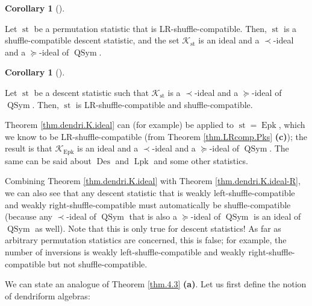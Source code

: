 \documentclass[numbers=enddot,12pt,final,onecolumn,notitlepage]{scrartcl}%
\theoremstyle{definition}
\newtheorem{coro}[theo]{Corollary}
\newenvironment{corollary}[1][]
{\begin{coro}[#1]\begin{leftbar}}
{\end{leftbar}\end{coro}}
\newenvironment{vershort}{}{}
\begin{document}
\begin{vershort}
\begin{corollary}
\label{cor.dendri.K.ideal-LR}Let $\operatorname*{st}$ be a permutation
statistic that is LR-shuffle-compatible. Then, $\operatorname*{st}$ is a
shuffle-compatible descent statistic, and the set $\mathcal{K}%
_{\operatorname*{st}}$ is an ideal and a $\left.  \prec\right.  $-ideal and a
$\left.  \succeq\right.  $-ideal of $\operatorname*{QSym}$.
\end{corollary}

\begin{corollary}
\label{cor.dendri.K.ideal-LRi}Let $\operatorname*{st}$ be a descent statistic
such that $\mathcal{K}_{\operatorname*{st}}$ is a $\left.  \prec\right.
$-ideal and a $\left.  \succeq\right.  $-ideal of $\operatorname*{QSym}$.
Then, $\operatorname*{st}$ is LR-shuffle-compatible and shuffle-compatible.
\end{corollary}

Theorem \ref{thm.dendri.K.ideal} can (for example) be applied to
$\operatorname*{st}=\operatorname*{Epk}$, which we know to be
LR-shuffle-compatible (from Theorem \ref{thm.LRcomp.Pks} \textbf{(c)}); the
result is that $\mathcal{K}_{\operatorname*{Epk}}$ is an ideal and a $\left.
\prec\right.  $-ideal and a $\left.  \succeq\right.  $-ideal of
$\operatorname*{QSym}$. The same can be said about $\operatorname*{Des}$ and
$\operatorname*{Lpk}$ and some other statistics.

Combining Theorem \ref{thm.dendri.K.ideal} with Theorem
\ref{thm.dendri.K.ideal-R}, we can also see that any descent statistic that is
weakly left-shuffle-compatible and weakly right-shuffle-compatible must
automatically be shuffle-compatible (because any $\left.  \prec\right.
$-ideal of $\operatorname*{QSym}$ that is also a $\left.  \succeq\right.
$-ideal of $\operatorname*{QSym}$ is an ideal of $\operatorname*{QSym}$ as
well). Note that this is only true for descent statistics! As far as arbitrary
permutation statistics are concerned, this is false; for example, the number
of inversions is weakly left-shuffle-compatible and weakly
right-shuffle-compatible but not shuffle-compatible.

We can state an analogue of Theorem
\ref{thm.4.3} \textbf{(a)}. Let us first define the notion of dendriform algebras:


\end{vershort}
\end{document}
